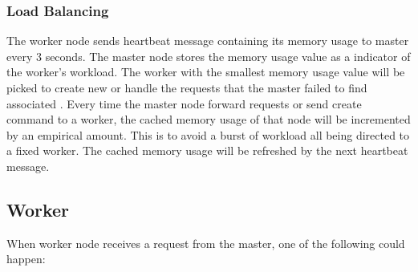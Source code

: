 \requestdispatchdiagram{}

\subsubsection{Load Balancing}
The worker node sends heartbeat message containing its memory usage to master every 3 seconds.
The master node stores the memory usage value as a indicator of the worker's workload.
The worker with the smallest memory usage value will be picked to create new \appins{} or
handle the requests that the master failed to find associated \appins{}.
Every time the master node forward requests or send create \appins{} command to a worker,
the cached memory usage of that node will be incremented by an empirical amount.
This is to avoid a burst of workload all being directed to a fixed worker.
The cached memory usage will be refreshed by the next heartbeat message.



\subsection{Worker}
\label{sec:worker}
When worker node receives a request from the master,
one of the following could happen:

